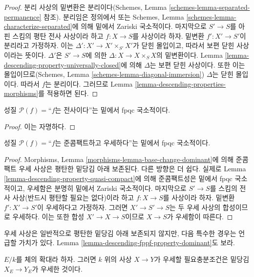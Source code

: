 \begin{proof}
분리 사상의 밑변환은 분리이다(Schemes, Lemma
\ref{schemes-lemma-separated-permanence} 참조). 분리임은 정의에서 또는
Schemes, Lemma \ref{schemes-lemma-characterize-separated}에 의해 밑에서
Zariski 국소적이다. 마지막으로 $S' \to S$를 아핀 스킴의 평탄 전사
사상이라 하고 $f : X \to S$를 사상이라 하자. 밑변환
$f' : X' \to S'$이 분리라고 가정하자. 이는
$\Delta' : X' \to X'\times_{S'} X'$가 닫힌 몰입이고, 따라서 보편 닫힌
사상이라는 뜻이다. $\Delta'$은 $S' \to S$에 의한
$\Delta : X \to X \times_S X$의 밑변환이다. Lemma
\ref{lemma-descending-property-universally-closed}에 의해 $\Delta$는
보편 닫힌 사상이다. 또한 이는 몰입이므로(Schemes, Lemma
\ref{schemes-lemma-diagonal-immersion}) $\Delta$는 닫힌 몰입이다.
따라서 $f$는 분리이다. 그러므로 Lemma
\ref{lemma-descending-properties-morphisms}를 적용하면 된다.
\end{proof}

\begin{lemma}
\label{lemma-descending-property-surjective}
성질 $\mathcal{P}(f) =$“$f$는 전사이다”는 밑에서 fpqc 국소적이다.
\end{lemma}

\begin{proof}
이는 자명하다.
\end{proof}

\begin{lemma}
\label{lemma-descending-property-dominant}
성질 $\mathcal{P}(f) =$“$f$는 준콤팩트하고 우세하다”는 밑에서 fpqc
국소적이다.
\end{lemma}

\begin{proof}
Morphisms, Lemma \ref{morphisms-lemma-base-change-dominant}에 의해
준콤팩트 우세 사상은 평탄한 밑당김 아래 보존된다. 다른 방향은 더 쉽다.
실제로 Lemma \ref{lemma-descending-property-quasi-compact}에 의해
준콤팩트성은 밑에서 fpqc 국소적이고, 우세함은 분명히 밑에서 Zariski
국소적이다. 마지막으로 $S' \to S$를 스킴의 전사 사상(반드시 평탄할
필요는 없다)이라 하고 $f : X \to S$를 사상이라 하자. 밑변환
$f' : X' \to S'$이 우세하다고 가정하자. 그러면 $X' \to S'\to S$는
두 우세 사상의 합성이므로 우세하다. 이는 또한 합성 $X' \to X \to S$이므로
$X\to S$가 우세함이 따른다.
\end{proof}

\noindent
우세 사상은 일반적으로 평탄한 밑당김 아래 보존되지 않지만, 다음 특수한
경우는 언급할 가치가 있다. Lemma
\ref{lemma-descending-fppf-property-dominant}도 보라.

\begin{lemma}
\label{lemma-descending-property-dominant-over-field}
$E/k$를 체의 확대라 하자. 그러면 $k$ 위의 사상 $X \to Y$가 우세할
필요충분조건은 밑당김 $X_E \to Y_E$가 우세한 것이다.
\end{lemma}

